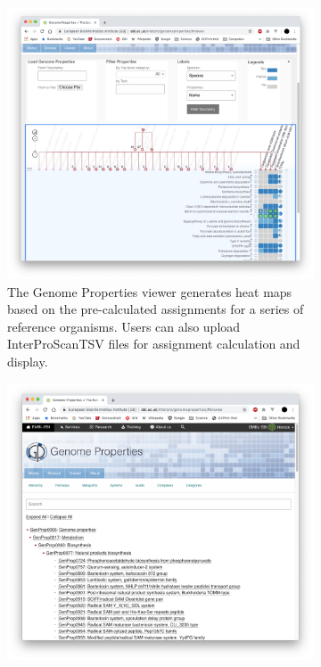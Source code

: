 \begin{figure}
     \centering
     \begin{subfigure}[b]{0.46\textwidth}
         \centering
         \includegraphics[width=\textwidth]{media/genome_properties_viewer.png}
         \caption{The Genome Properties viewer generates heat maps based on the pre-calculated assignments for a series of reference organisms. Users can also upload InterProScanTSV files for assignment calculation and display.}
         \label{fig:property-viewer}
     \end{subfigure}
     \qquad %
     \begin{subfigure}[b]{0.46\textwidth}
         \centering
         \includegraphics[width=\textwidth]{media/genome_properties_browser.png}

\end{subfigure}
\end{figure}
